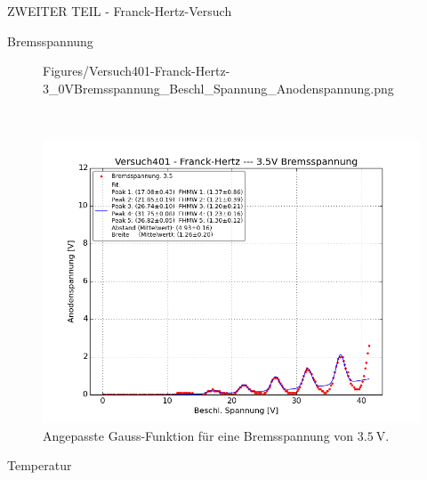 \begin{appendix}
\begin{chapter}{ZWEITER TEIL - Franck-Hertz-Versuch}
\begin{section}{Bremsspannung}
\begin{figure}[ht]
\begin{minipage}{0.48\textwidth}
              {Figures/Versuch401-Franck-Hertz-3_0VBremsspannung_Beschl_Spannung_Anodenspannung.png}
          \caption{Angepasste Gauss-Funktion für eine Bremsspannung von 
              $\SI{3.0}{\volt}$.}
          \label{fig:AnhangFHB30V}
        \end{minipage} \\
        \begin{minipage}{0.48\textwidth}
          \centering
          \includegraphics[width=\textwidth]
              {Figures/Versuch401-Franck-Hertz-3_5VBremsspannung_Beschl_Spannung_Anodenspannung.png}
          \caption{Angepasste Gauss-Funktion für eine Bremsspannung von 
              $\SI{3.5}{\volt}$.}
          \label{fig:AnhangFHB35V}
        \end{minipage}
      \end{figure}
      
    \end{section}
    
    
    
    \newpage
    \begin{section}{Temperatur}
      \label{Anhang:chp:FHtemperatur}
      

\end{section}
\end{chapter}
\end{appendix}
